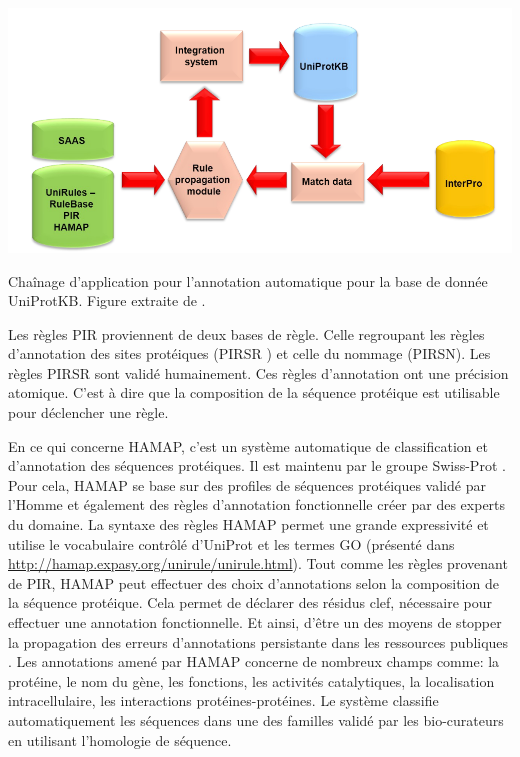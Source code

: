 \begin{refsegment}
    \begin{shadedfigure}[H]
        \centering
        \includegraphics[width=\textwidth]{img/unirule.png}
        \caption{ Chaînage d'application pour l'annotation automatique pour la base de donnée UniProtKB. Figure extraite de . }
        \label{fig:unirule}
    \end{shadedfigure}

    Les règles \acrshort{PIR} proviennent de deux bases de règle.  Celle regroupant les règles d'annotation des sites protéiques (\acrfull{PIRSR} \cite{vasudevan2011structure}) et celle du nommage (\acrfull{PIRSN}). Les règles \acrfull{PIRSR} sont validé humainement. Ces règles d'annotation ont une précision atomique. C'est à dire que la composition de la séquence protéique est utilisable pour déclencher une règle.
    
    En ce qui concerne \acrfull{HAMAP}, c'est un système automatique de classification et d'annotation des séquences protéiques. Il est maintenu par le groupe Swiss-Prot . Pour cela, \acrfull{HAMAP} se base sur des profiles de séquences protéiques validé par l'Homme et également des règles d'annotation fonctionnelle créer par des experts du domaine. La syntaxe des règles  \acrfull{HAMAP} permet une grande expressivité et utilise le vocabulaire contrôlé d'UniProt et les termes \acrfull{GO} (présenté dans \url{http://hamap.expasy.org/unirule/unirule.html}). Tout comme les règles provenant de \acrfull{PIR}, \acrfull{HAMAP} peut effectuer des choix d'annotations selon la composition de la séquence protéique. Cela permet de déclarer des résidus clef, nécessaire pour effectuer une annotation fonctionnelle. Et ainsi, d'être un des moyens de stopper la propagation des erreurs d'annotations persistante dans les ressources publiques \cite{schnoes2009annotation,devos2001intrinsic,bell2013can,gilks2002modeling}. Les annotations amené par \acrfull{HAMAP} concerne de nombreux champs comme: la protéine, le nom du gène, les fonctions, les activités catalytiques, la localisation intracellulaire, les interactions protéines-protéines. Le système classifie automatiquement les séquences dans une des familles validé par les bio-curateurs en utilisant l'homologie de séquence.
    

\end{refsegment}
